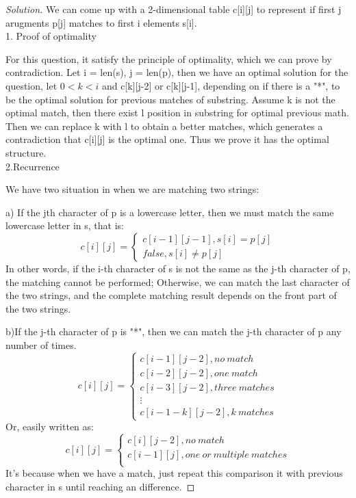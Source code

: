 \documentclass[12pt]{article}
\begin{document}
\begin{proof}[Solution]
	We can come up with a 2-dimensional table c[i][j] to represent if first j arugments p[j] matches to first i elements s[i].\\
	1. Proof of optimality
	
	For this question, it satisfy the principle of optimality, which we can prove by contradiction. Let i = len(s), j = len(p), then we have an optimal solution for the question, let $0<k<i$ and c[k][j-2] or c[k][j-1], depending on if there is a "*", to be the optimal solution for previous matches of substring. Assume k is not the optimal match, then there exist l position in substring for optimal previous math. Then we can replace k with l to obtain a better matches, which generates a contradiction that c[i][j] is the optimal one. Thus we prove it has the optimal structure.\\
	2.Recurrence
	
	We have two situation in when we are matching two strings:
	
	a) If the jth character of p is a lowercase letter, then we must match the same lowercase letter in s, that is:\\
	\begin{equation*}
		c[i][j]=
		\begin{cases}
			c[i-1][j-1], s[i]=p[j]\\
			false, s[i]\ne p[j]
		\end{cases}
	\end{equation*}
	In other words, if the i-th character of s is not the same as the j-th character of p, the matching cannot be performed; Otherwise, we can match the last character of the two strings, and the complete matching result depends on the front part of the two strings.
	
	b)If the j-th character of p is "*", then we can match the j-th character of p any number of times.
	\begin{equation*}
		c[i][j]=
		\begin{cases}
			c[i-1][j-2], no\ match\\
			c[i-2][j-2], one\ match\\
			c[i-3][j-2], three\ matches\\
			\vdots\\
			c[i-1-k][j-2], k\ matches
		\end{cases}
	\end{equation*}
	Or, easily written as:\\
	\begin{equation*}
	c[i][j]=
	\begin{cases}
		c[i][j-2], no\ match\\
		c[i-1][j], one\ or\ multiple\ matches\\
	\end{cases}
	\end{equation*}
	It's because when we have a match, just repeat this	comparison it with previous character in s until reaching an difference.
	

\end{proof}
\end{document}
